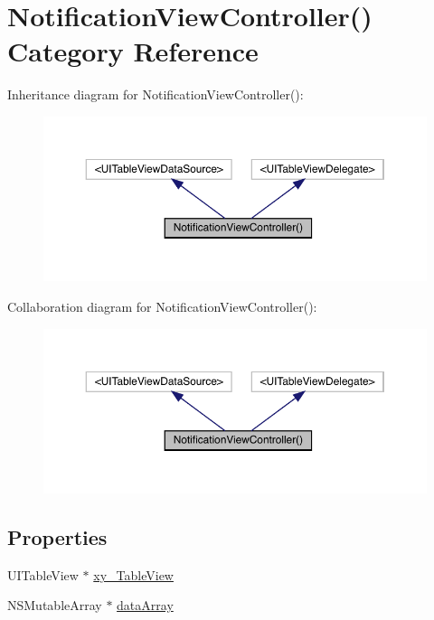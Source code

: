 \hypertarget{category_notification_view_controller_07_08}{}\section{Notification\+View\+Controller() Category Reference}
\label{category_notification_view_controller_07_08}


Inheritance diagram for Notification\+View\+Controller()\+:\nopagebreak
\begin{figure}[H]
\begin{center}
\leavevmode
\includegraphics[width=350pt]{category_notification_view_controller_07_08__inherit__graph}
\end{center}
\end{figure}


Collaboration diagram for Notification\+View\+Controller()\+:\nopagebreak
\begin{figure}[H]
\begin{center}
\leavevmode
\includegraphics[width=350pt]{category_notification_view_controller_07_08__coll__graph}
\end{center}
\end{figure}
\subsection*{Properties}
\begin{DoxyCompactItemize}
\item 
U\+I\+Table\+View $\ast$ \mbox{\hyperlink{category_notification_view_controller_07_08_a89d7f33de104f0dbd5339e5f4015aa6f}{xy\+\_\+\+Table\+View}}
\item 
N\+S\+Mutable\+Array $\ast$ \mbox{\hyperlink{category_notification_view_controller_07_08_afdfbeb1a7d138d332ada33b09cdde5bf}{data\+Array}}
\end{DoxyCompactItemize}


